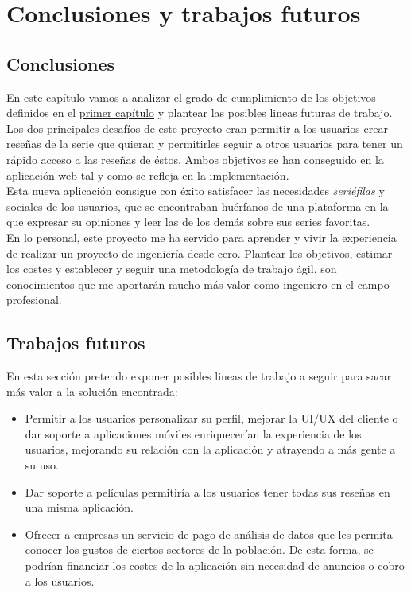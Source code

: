 \chapter{Conclusiones y trabajos futuros}
\section{Conclusiones}
En este capítulo vamos a analizar el grado de cumplimiento de los objetivos definidos en el
\hyperref[sec:objetivo]{primer capítulo} y plantear las posibles lineas futuras de trabajo.\\

Los dos principales desafíos de este proyecto eran permitir a los usuarios crear reseñas de la serie que quieran y
permitirles seguir a otros usuarios para tener un rápido acceso a las reseñas de éstos. Ambos objetivos se han
conseguido en la aplicación web tal y como se refleja en la \hyperref[chap:implementación]{implementación}.\\

Esta nueva aplicación consigue con éxito satisfacer las necesidades \textit{seriéfilas} y sociales de los usuarios, que
se encontraban huérfanos de una plataforma en la que expresar su opiniones y leer las de los demás sobre sus series
favoritas.\\

En lo personal, este proyecto me ha servido para aprender y vivir la experiencia de realizar un proyecto de ingeniería
desde cero. Plantear los objetivos, estimar los costes y establecer y seguir una metodología de trabajo ágil, son
conocimientos que me aportarán mucho más valor como ingeniero en el campo profesional.\\

\section{Trabajos futuros}
En esta sección pretendo exponer posibles lineas de trabajo a seguir para sacar más valor a la solución encontrada:

\begin{itemize}
    \item Permitir a los usuarios personalizar su perfil, mejorar la UI/UX del cliente o dar soporte a aplicaciones
    móviles enriquecerían la experiencia de los usuarios, mejorando su relación con la aplicación y atrayendo a más
    gente a su uso.
    \item Dar soporte a películas permitiría a los usuarios tener todas sus reseñas en una misma aplicación.
    \item Ofrecer a empresas un servicio de pago de análisis de datos que les permita conocer los gustos de ciertos
    sectores de la población. De esta forma, se podrían financiar los costes de la aplicación sin necesidad de anuncios
    o cobro a los usuarios.
\end{itemize}
